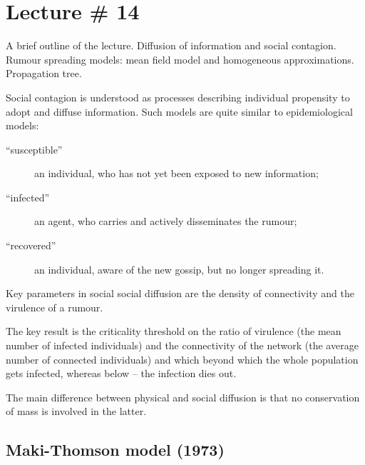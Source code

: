 \documentclass[a4paper]{article}
\begin{document}


\section{Lecture \# 14} %
\label{sec:lecture_14}

A brief outline of the lecture. Diffusion of information and social contagion.
Rumour spreading models: mean field model and homogeneous approximations.
Propagation tree.

Social contagion is understood as processes describing individual propensity to
adopt and diffuse information. Such models are quite similar to epidemiological 
models:
\begin{description}
	\item [``susceptible''] an individual, who has not yet been exposed to new
	information;
	\item [``infected''] an agent, who carries and actively disseminates the
	rumour;
	\item [``recovered''] an individual, aware of the new gossip, but no longer
	spreading it.
\end{description}

Key parameters in social social diffusion are the density of connectivity and the
virulence of a rumour.

The key result is the criticality threshold on the ratio of virulence (the mean
number of infected individuals) and the connectivity of the network (the average
number of connected individuals) and which beyond which the whole population gets
infected, whereas below -- the infection dies out.

The main difference between physical and social diffusion is that no conservation
of mass is involved in the latter.

\subsection{Maki-Thomson model (1973)} %
\label{sub:maki_thomson_model_1973}
\end{document}
